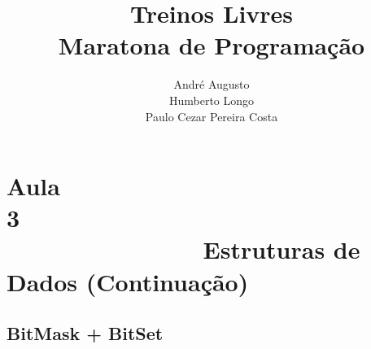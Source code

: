 \documentclass{beamer}
\title[Treinos Livres]{Treinos Livres\\ Maratona de Programação}
\author[{\tiny André, Humberto, Paulo Cezar}]{André Augusto\\ Humberto Longo\\ Paulo Cezar Pereira Costa }
\institute[]{Instituto de Informática\\
           Universidade Federal de Goiás}
\begin{document}
\maketitle

%
%
%

\section{Aula 3\ \ \ \ \ \ \ \ \ \ \ \ \ \ \ \ \ \ \ \ \ \ \ \ \ \ \ \ \ \ \ \ \ \ \ \ \ \ \ \ \ \ \ \ \  Estruturas de Dados (Continuação)}

\subsection{BitMask + BitSet}

\end{document}

